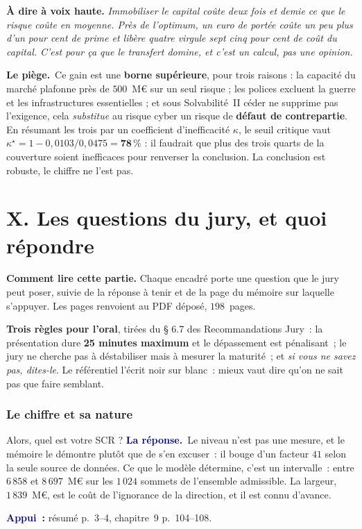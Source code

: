 \documentclass[11pt,a4paper]{article}
\newcommand{\lepiege}[1]{\smallskip\noindent\textcolor{accent}{\textbf{Le piège.}}\ #1\par}
\newcommand{\laphrase}[1]{\begin{phrasebox}\textbf{À dire à voix haute.} \emph{#1}\end{phrasebox}}
\newcommand{\rep}[1]{\smallskip\noindent\textcolor{navy}{\textbf{La réponse.}}\ #1\par}
\newcommand{\appui}[1]{\smallskip\noindent\small\textcolor{navy}{\textbf{Appui~:}} #1\par\normalsize}
\begin{document}
\laphrase{Immobiliser le capital coûte deux fois et demie ce que le risque coûte en moyenne.
Près de l'optimum, un euro de portée coûte un peu plus d'un pour cent de prime et libère
quatre virgule sept cinq pour cent de coût du capital. C'est pour ça que le transfert domine, et
c'est un calcul, pas une opinion.}

\lepiege{Ce gain est une \textbf{borne supérieure}, pour trois raisons : la capacité du marché
plafonne près de $500$~M\euro{} sur un seul risque ; les polices excluent la guerre et les
infrastructures essentielles ; et sous Solvabilité~II céder ne supprime pas l'exigence, cela
\emph{substitue} au risque cyber un risque de \textbf{défaut de contrepartie}. En résumant les
trois par un coefficient d'inefficacité $\kappa$, le seuil critique vaut
$\kappa^\star=1-0{,}0103/0{,}0475=\mathbf{78\,\%}$ : il faudrait que plus des trois quarts de la
couverture soient inefficaces pour renverser la conclusion. La conclusion est robuste, le
chiffre ne l'est pas.}

\newpage
\part*{X. Les questions du jury, et quoi répondre}

\begin{cle}
\textbf{Comment lire cette partie.} Chaque encadré porte une question que le jury peut poser,
suivie de la réponse à tenir et de la page du mémoire sur laquelle s'appuyer. Les pages
renvoient au PDF déposé, $198$~pages.

\textbf{Trois règles pour l'oral}, tirées du § 6.7 des Recommandations Jury~: la présentation
dure \textbf{25 minutes maximum} et le dépassement est pénalisant~; le jury ne cherche pas à
déstabiliser mais à mesurer la maturité~; et \emph{si vous ne savez pas, dites-le}. Le
référentiel l'écrit noir sur blanc~: mieux vaut dire qu'on ne sait pas que faire semblant.
\end{cle}

\section{Le chiffre et sa nature}

\begin{question}{\og Alors, quel est votre SCR ?\fg{}}
\rep{Le niveau n'est pas une mesure, et le mémoire le démontre plutôt que de s'en excuser~: il
bouge d'un facteur $41$ selon la seule source de données. Ce que le modèle détermine, c'est un
intervalle~: entre $6\,858$ et $8\,697$~M\euro{} sur les $1\,024$ sommets de l'ensemble
admissible. La largeur, $1\,839$~M\euro, est le coût de l'ignorance de la direction, et il est
connu d'avance.}
\appui{résumé p.~3--4, chapitre~9 p.~104--108.}
\end{question}
\end{document}
